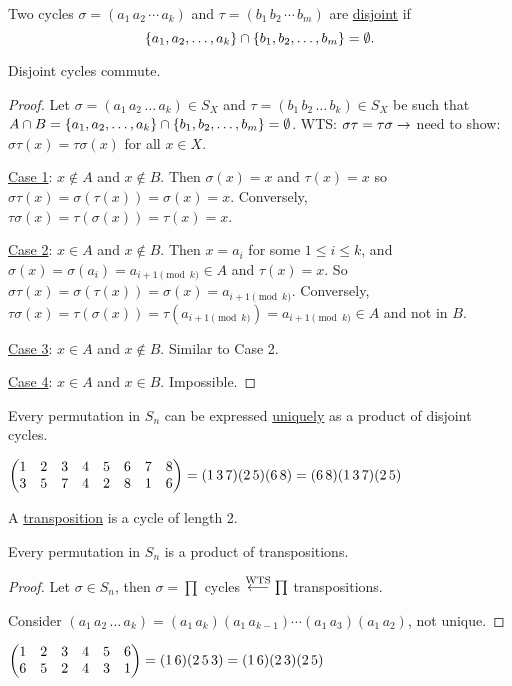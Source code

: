 \documentclass[]{article}
\begin{document}
\begin{definition}
	Two cycles $\sigma = (a_1\, a_2\,\cdots\, a_k)$ and $\tau = (b_1\,b_2\,\cdots\,b_m)$ are \ul{disjoint} if $$\left\{ a_1,a_2,\dots,a_k \right\}\cap \left\{ b_1,b_2,\dots,b_m \right\} = \emptyset.$$
\end{definition}

\begin{proposition}
	Disjoint cycles commute.
\end{proposition}
\begin{proof}
	Let $\sigma = (a_1\,a_2\,\dots\,a_k)\in S_X$ and $\tau = (b_1\,b_2\,\dots\,b_k)\in S_X$ be such that $A\cap B = \left\{ a_1,a_2,\dots,a_k \right\}\cap \left\{ b_1,b_2,\dots,b_m \right\} = \emptyset$.
	WTS: $\sigma\tau = \tau\sigma \rightarrow$ need to show: $\sigma\tau(x) = \tau\sigma(x)$ for all $x\in X$.

	\ul{Case 1}: $x\notin A$ and $x\notin B$. Then $\sigma(x) = x$ and $\tau(x) = x$ so $\sigma\tau(x) = \sigma(\tau(x)) = \sigma(x) = x$. Conversely, $\tau\sigma(x) = \tau(\sigma(x)) = \tau(x) = x$.

	\ul{Case 2}: $x\in A$ and $x\notin B$. Then $x = a_i$ for some $1\leq i\leq k$, and $\sigma(x) = \sigma(a_i) = a_{i+1\pmod k}\in A$ and $\tau(x) = x$. So $\sigma\tau(x) = \sigma(\tau(x)) = \sigma(x) = a_{i+1\pmod k}$. Conversely, $\tau\sigma(x) = \tau(\sigma(x)) = \tau(a_{i+1\pmod k}) = a_{i+1\pmod k}\in A$ and not in $B$.

	\ul{Case 3}: $x\in A$ and $x\notin B$. Similar to Case 2.

	\ul{Case 4}: $x\in A$ and $x\in B$. Impossible.
\end{proof}

\newpage

\begin{theorem}
	Every permutation in $S_n$ can be expressed \ul{uniquely} as a product of disjoint cycles.
\end{theorem}
\begin{example}
	$\begin{pmatrix}1&2&3&4&5&6&7&8\\3&5&7&4&2&8&1&6\end{pmatrix} = (1\,3\,7)(2\,5)(6\,8) = (6\,8)(1\,3\,7)(2\,5)$
\end{example}
\begin{definition}
	A \ul{transposition} is a cycle of length 2.
\end{definition}
\begin{proposition}
	Every permutation in $S_n$ is a product of transpositions.
\end{proposition}
\begin{proof}
	Let $\sigma\in S_n$, then $\sigma = \prod$ cycles $\overset{\text{WTS}}{\longleftarrow} \prod$ transpositions.
	
	Consider $(a_1\,a_2\,\dots\,a_k) = (a_1\,a_k)(a_1\,a_{k-1})\cdots(a_1\,a_3)(a_1\,a_2)$, not unique.
\end{proof}
\begin{example}
	$\begin{pmatrix}1&2&3&4&5&6\\6&5&2&4&3&1\end{pmatrix} = (1\,6)(2\,5\,3) = (1\,6)(2\,3)(2\,5)$
\end{example}
\end{document}
